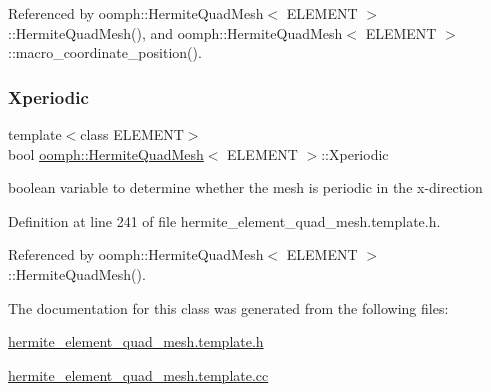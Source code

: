Referenced by oomph\+::\+Hermite\+Quad\+Mesh$<$ E\+L\+E\+M\+E\+N\+T $>$\+::\+Hermite\+Quad\+Mesh(), and oomph\+::\+Hermite\+Quad\+Mesh$<$ E\+L\+E\+M\+E\+N\+T $>$\+::macro\+\_\+coordinate\+\_\+position().

\mbox{\label{classoomph_1_1HermiteQuadMesh_af1c2c974dc0d2e599b6bbe3921c5bb77}} 
\subsubsection{\texorpdfstring{Xperiodic}{Xperiodic}}
{\footnotesize\ttfamily template$<$class E\+L\+E\+M\+E\+NT$>$ \\
bool \hyperlink{classoomph_1_1HermiteQuadMesh}{oomph\+::\+Hermite\+Quad\+Mesh}$<$ E\+L\+E\+M\+E\+NT $>$\+::Xperiodic\hspace{0.3cm}{\ttfamily [private]}}



boolean variable to determine whether the mesh is periodic in the x-\/direction 



Definition at line 241 of file hermite\+\_\+element\+\_\+quad\+\_\+mesh.\+template.\+h.



Referenced by oomph\+::\+Hermite\+Quad\+Mesh$<$ E\+L\+E\+M\+E\+N\+T $>$\+::\+Hermite\+Quad\+Mesh().



The documentation for this class was generated from the following files\+:\begin{DoxyCompactItemize}
\item 
\hyperlink{hermite__element__quad__mesh_8template_8h}{hermite\+\_\+element\+\_\+quad\+\_\+mesh.\+template.\+h}\item 
\hyperlink{hermite__element__quad__mesh_8template_8cc}{hermite\+\_\+element\+\_\+quad\+\_\+mesh.\+template.\+cc}\end{DoxyCompactItemize}
